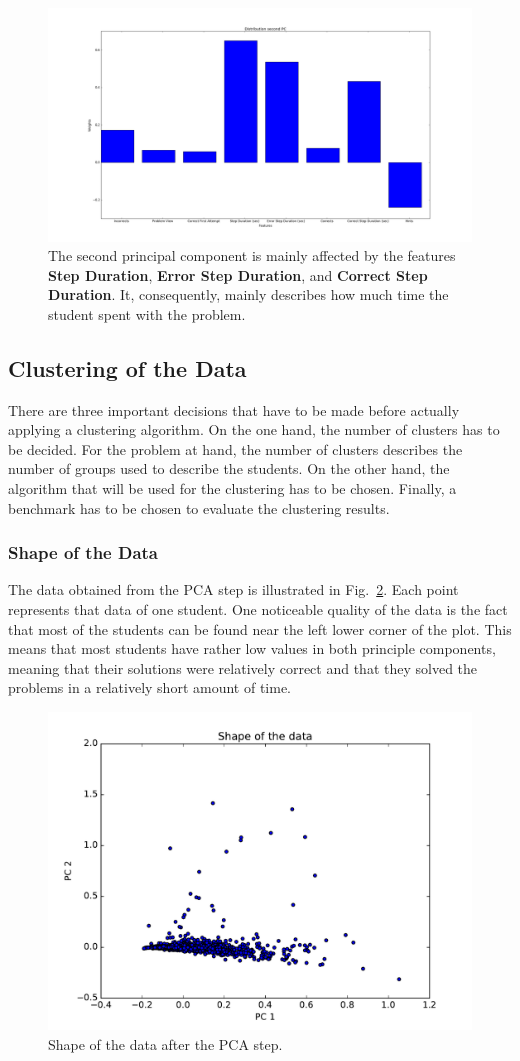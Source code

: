   
    \begin{figure}
    	\centering
    	\includegraphics[width=\textwidth]{./img/pc2.png}
    	\caption{The second principal component is mainly affected by the features \textbf{Step Duration}, \textbf{Error Step Duration}, and \textbf{Correct Step Duration}. It, consequently, mainly describes how much time the student spent with the problem.\label{fig_pc2}}
    \end{figure}
    
\subsection{Clustering of the Data}
There are three important decisions that have to be made before actually applying a clustering algorithm. On the one hand, the number of clusters has to be decided. For the problem at hand, the number of clusters describes the number of groups used to describe the students. On the other hand, the algorithm that will be used for the clustering has to be chosen. Finally, a benchmark has to be chosen to evaluate the clustering results.  

\subsubsection{Shape of the Data}
The data obtained from the PCA step is illustrated in Fig.~\ref{fig_data_shape}. Each point represents that data of one student. One noticeable quality of the data is the fact that most of the students can be found near the left lower corner of the plot. This means that most students have rather low values in both principle components, meaning that their solutions were relatively correct and that they solved the problems in a relatively short amount of time.  

\begin{figure}
	\centering
	\includegraphics[width=.5\textwidth]{./img/data_shape.pdf}
	\caption{Shape of the data after the PCA step.\label{fig_data_shape}}
\end{figure}


